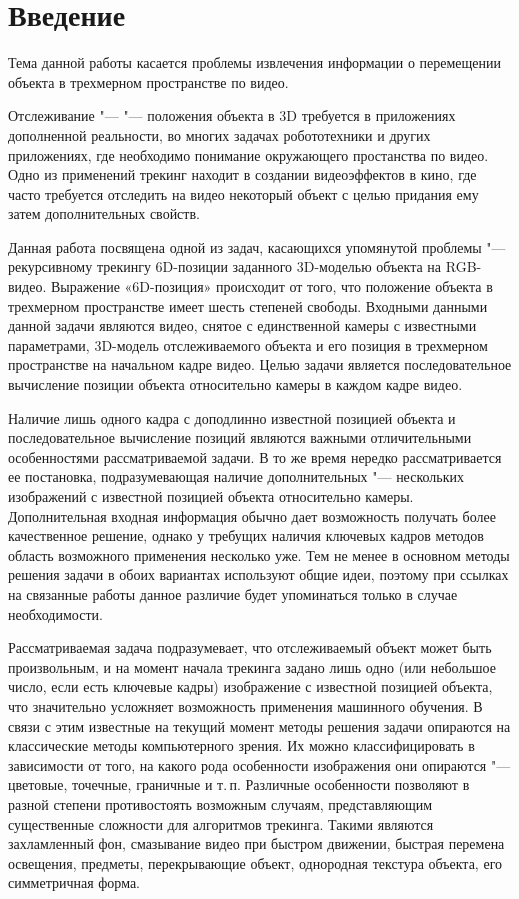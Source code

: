 \section{Введение}

Тема данной работы касается проблемы извлечения информации о перемещении
объекта в трехмерном пространстве по видео.

Отслеживание "---  "--- положения объекта в 3D требуется в
приложениях дополненной реальности\cite{Radkowski}, во многих задачах
робототехники\cite{Robotics} и других приложениях, где необходимо понимание
окружающего простанства по видео.
Одно из применений трекинг находит в создании видеоэффектов в кино, где часто
требуется отследить на видео некоторый объект с целью придания ему затем
дополнительных свойств\cite{Bugaev_2018_ECCV}.

Данная работа посвящена одной из задач, касающихся упомянутой проблемы "---
рекурсивному трекингу 6D-позиции заданного 3D-моделью объекта на RGB-видео.
Выражение «6D-позиция» происходит от того, что положение объекта в трехмерном
пространстве имеет шесть степеней свободы.
Входными данными данной задачи являются видео, снятое с единственной
камеры с известными параметрами, 3D-модель отслеживаемого объекта
и его позиция в трехмерном пространстве на начальном кадре видео.
Целью задачи является последовательное вычисление позиции объекта относительно
камеры в каждом кадре видео.

Наличие лишь одного кадра с доподлинно известной позицией объекта и
последовательное вычисление позиций являются важными отличительными
особенностями рассматриваемой задачи.
В то же время нередко рассматривается ее постановка, подразумевающая наличие
дополнительных  "--- нескольких изображений с известной
позицией объекта относительно камеры.
Дополнительная входная информация обычно дает возможность получать более
качественное решение, однако у требущих наличия ключевых кадров методов область
возможного применения несколько уже.
Тем не менее в основном методы решения задачи в обоих вариантах используют
общие идеи, поэтому при ссылках на связанные работы данное различие будет
упоминаться только в случае необходимости.

Рассматриваемая задача подразумевает, что отслеживаемый объект может быть
произвольным, и на момент начала трекинга задано лишь одно (или небольшое
число, если есть ключевые кадры) изображение с известной позицией объекта,
что значительно усложняет возможность применения машинного обучения.
В связи с этим известные на текущий момент методы решения задачи опираются на
классические методы компьютерного зрения.
Их можно классифицировать в зависимости от того, на какого рода особенности
изображения они опираются "--- цветовые, точечные, граничные и т.\,п.
Различные особенности позволяют в разной степени противостоять возможным
случаям, представляющим существенные сложности для алгоритмов трекинга.
Такими являются захламленный фон, смазывание видео при быстром движении,
быстрая перемена освещения, предметы, перекрывающие объект,
однородная текстура объекта, его симметричная форма.

